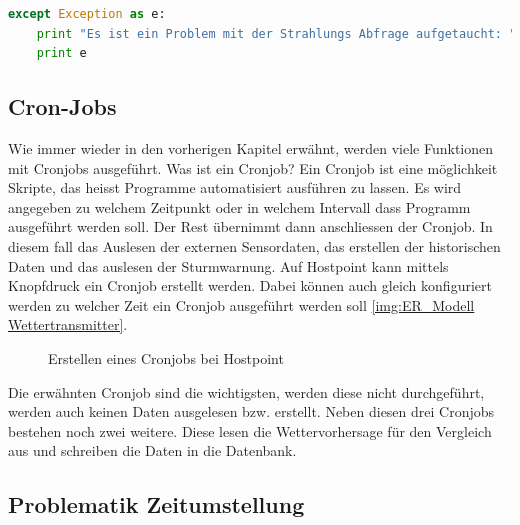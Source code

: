 \begin{lstlisting}[label=lst:printfunction,caption=Beispiel für print Funktion, language=Python, style=py]
except Exception as e:
    print "Es ist ein Problem mit der Strahlungs Abfrage aufgetaucht: "
    print e
\end{lstlisting}

\subsection{Cron-Jobs}
Wie immer wieder in den vorherigen Kapitel erwähnt, werden viele Funktionen mit Cronjobs ausgeführt. Was ist ein Cronjob? Ein Cronjob ist eine möglichkeit Skripte, das heisst Programme automatisiert ausführen zu lassen. Es wird angegeben zu welchem Zeitpunkt oder in welchem Intervall dass Programm ausgeführt werden soll. Der Rest übernimmt dann anschliessen der Cronjob. In diesem fall das Auslesen der externen Sensordaten, das erstellen der historischen Daten und das auslesen der Sturmwarnung. Auf Hostpoint kann mittels Knopfdruck ein Cronjob erstellt werden. Dabei können auch gleich konfiguriert werden zu welcher Zeit ein Cronjob ausgeführt werden soll \ref{img:ER_Modell Wettertransmitter}.

\begin{figure}[h!]
	\centering
	\caption{Erstellen eines Cronjobs bei Hostpoint}
	\label{img:Cronjob}
\end{figure}
\newline

Die erwähnten Cronjob sind die wichtigsten, werden diese nicht durchgeführt, werden auch keinen Daten ausgelesen bzw. erstellt. Neben diesen drei Cronjobs bestehen noch zwei weitere. Diese lesen die Wettervorhersage für den Vergleich aus und schreiben die Daten in die Datenbank.

\subsection{Problematik Zeitumstellung}
\newline
